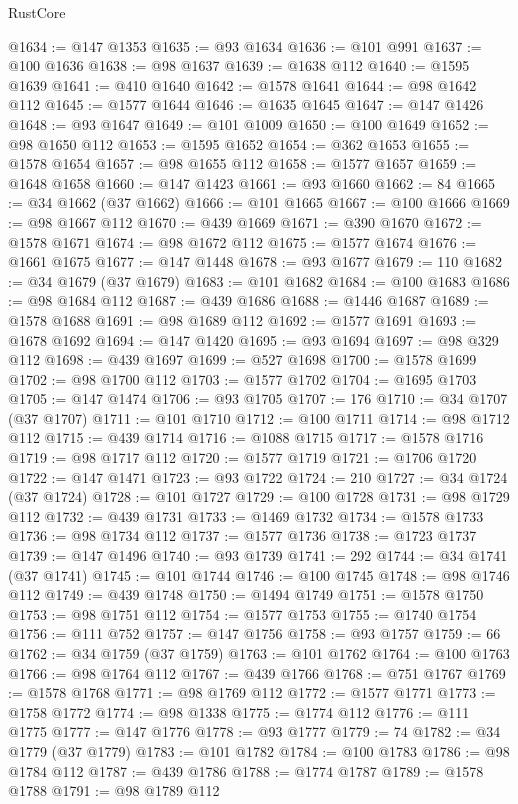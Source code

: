 \begin{lexlean}{RustCore}
\begin{coremodule}
@1634 := @147 @1353
@1635 := @93 @1634
@1636 := @101 @991
@1637 := @100 @1636
@1638 := @98 @1637
@1639 := @1638 @112
@1640 := @1595 @1639
@1641 := @410 @1640
@1642 := @1578 @1641
@1644 := @98 @1642 @112
@1645 := @1577 @1644
@1646 := @1635 @1645
@1647 := @147 @1426
@1648 := @93 @1647
@1649 := @101 @1009
@1650 := @100 @1649
@1652 := @98 @1650 @112
@1653 := @1595 @1652
@1654 := @362 @1653
@1655 := @1578 @1654
@1657 := @98 @1655 @112
@1658 := @1577 @1657
@1659 := @1648 @1658
@1660 := @147 @1423
@1661 := @93 @1660
@1662 := 84
@1665 := @34 @1662 (@37 @1662)
@1666 := @101 @1665
@1667 := @100 @1666
@1669 := @98 @1667 @112
@1670 := @439 @1669
@1671 := @390 @1670
@1672 := @1578 @1671
@1674 := @98 @1672 @112
@1675 := @1577 @1674
@1676 := @1661 @1675
@1677 := @147 @1448
@1678 := @93 @1677
@1679 := 110
@1682 := @34 @1679 (@37 @1679)
@1683 := @101 @1682
@1684 := @100 @1683
@1686 := @98 @1684 @112
@1687 := @439 @1686
@1688 := @1446 @1687
@1689 := @1578 @1688
@1691 := @98 @1689 @112
@1692 := @1577 @1691
@1693 := @1678 @1692
@1694 := @147 @1420
@1695 := @93 @1694
@1697 := @98 @329 @112
@1698 := @439 @1697
@1699 := @527 @1698
@1700 := @1578 @1699
@1702 := @98 @1700 @112
@1703 := @1577 @1702
@1704 := @1695 @1703
@1705 := @147 @1474
@1706 := @93 @1705
@1707 := 176
@1710 := @34 @1707 (@37 @1707)
@1711 := @101 @1710
@1712 := @100 @1711
@1714 := @98 @1712 @112
@1715 := @439 @1714
@1716 := @1088 @1715
@1717 := @1578 @1716
@1719 := @98 @1717 @112
@1720 := @1577 @1719
@1721 := @1706 @1720
@1722 := @147 @1471
@1723 := @93 @1722
@1724 := 210
@1727 := @34 @1724 (@37 @1724)
@1728 := @101 @1727
@1729 := @100 @1728
@1731 := @98 @1729 @112
@1732 := @439 @1731
@1733 := @1469 @1732
@1734 := @1578 @1733
@1736 := @98 @1734 @112
@1737 := @1577 @1736
@1738 := @1723 @1737
@1739 := @147 @1496
@1740 := @93 @1739
@1741 := 292
@1744 := @34 @1741 (@37 @1741)
@1745 := @101 @1744
@1746 := @100 @1745
@1748 := @98 @1746 @112
@1749 := @439 @1748
@1750 := @1494 @1749
@1751 := @1578 @1750
@1753 := @98 @1751 @112
@1754 := @1577 @1753
@1755 := @1740 @1754
@1756 := @111 @752
@1757 := @147 @1756
@1758 := @93 @1757
@1759 := 66
@1762 := @34 @1759 (@37 @1759)
@1763 := @101 @1762
@1764 := @100 @1763
@1766 := @98 @1764 @112
@1767 := @439 @1766
@1768 := @751 @1767
@1769 := @1578 @1768
@1771 := @98 @1769 @112
@1772 := @1577 @1771
@1773 := @1758 @1772
@1774 := @98 @1338
@1775 := @1774 @112
@1776 := @111 @1775
@1777 := @147 @1776
@1778 := @93 @1777
@1779 := 74
@1782 := @34 @1779 (@37 @1779)
@1783 := @101 @1782
@1784 := @100 @1783
@1786 := @98 @1784 @112
@1787 := @439 @1786
@1788 := @1774 @1787
@1789 := @1578 @1788
@1791 := @98 @1789 @112

\end{coremodule}
\end{lexlean}
